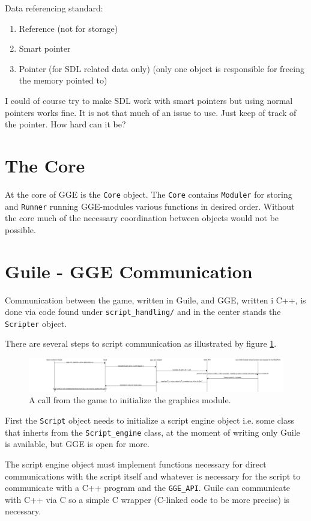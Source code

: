 Data referencing standard:
\begin{enumerate}
	\item Reference (not for storage)
	\item Smart pointer
	\item Pointer (for SDL related data only) (only one object is responsible for freeing the memory pointed to)
\end{enumerate}
I could of course try to make SDL work with smart pointers but using normal pointers works fine. It is not that much of an issue to use. Just keep of track of the pointer. How hard can it be?

\section{The Core}
At the core of GGE is the \verb|Core| object. The \verb|Core| contains \verb|Moduler| for storing and \verb|Runner| running GGE-modules various functions in desired order.
Without the core much of the necessary coordination between objects would not be possible.

\section{Guile - GGE Communication}
Communication between the game, written in Guile, and GGE, written i C++, is done via code found under \verb|script_handling/| and in the center stands the \verb|Scripter| object. 

There are several steps to script communication as illustrated by figure \ref{fig:script_init_example}.
\begin{figure}
	\includegraphics[]{charts/script_communication.png}
	\caption{A call from the game to initialize the graphics module.}
	\label{fig:script_init_example}
\end{figure}

First the \verb|Script| object needs to initialize a script engine object i.e. some class that inherts from the
\verb|Script_engine| class, at the moment of writing only Guile is available, but GGE is open for more.

The script engine object must implement functions necessary for direct communications with the script itself and
whatever is necessary for the script to communicate with a C++ program and the \verb|GGE_API|.
Guile can communicate with C++ via C so a simple C wrapper (C-linked code to be more precise) is necessary.

